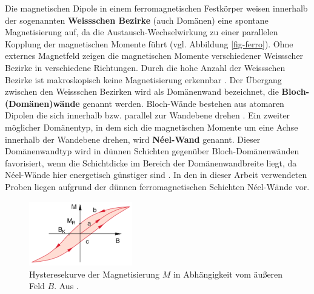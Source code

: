 \documentclass[page,pdftex,12pt,a4paper,twoside,openright]{scrbook}
\begin{document}
Die magnetischen Dipole in einem ferromagnetischen Festkörper weisen innerhalb der sogenannten \textbf{Weissschen Bezirke} (auch Domänen) eine spontane Magnetisierung auf, da die Austausch-Wechselwirkung zu einer parallelen Kopplung der magnetischen Momente führt (vgl. Abbildung \ref{fig-ferro}). Ohne externes Magnetfeld zeigen die magnetischen Momente verschiedener Weissscher Bezirke in verschiedene Richtungen. Durch die hohe Anzahl der Weissschen Bezirke ist makroskopisch keine Magnetisierung erkennbar \cite{rybach_physik_2008}. Der Übergang zwischen den Weissschen Bezirken wird als Domänenwand bezeichnet, die \textbf{Bloch-(Domänen)wände} genannt werden. Bloch-Wände bestehen aus atomaren Dipolen die sich innerhalb bzw. parallel zur Wandebene drehen \cite{gross_festkorperphysik_2012}. Ein zweiter möglicher Domänentyp, in dem sich die magnetischen Momente um eine Achse innerhalb der Wandebene drehen, wird \textbf{Néel-Wand} genannt. Dieser Domänenwandtyp wird in dünnen Schichten gegenüber Bloch-Domänenwänden favorisiert, wenn die Schichtdicke im Bereich der Domänenwandbreite liegt, da Néel-Wände hier energetisch günstiger sind \cite{hubert_magnetic_2008}. In den in dieser Arbeit verwendeten Proben liegen aufgrund der dünnen ferromagnetischen Schichten Néel-Wände vor.\\

\begin{figure}[h]
\centering
\includegraphics[width=0.4\textwidth]{img/hysterese.png}
\caption{\label{fig-hysterese}
Hysteresekurve der Magnetisierung \(M\) in Abhängigkeit vom äußeren Feld \(B\). Aus \cite{demtroder_experimentalphysik_2017}.}
\end{figure}
\end{document}
